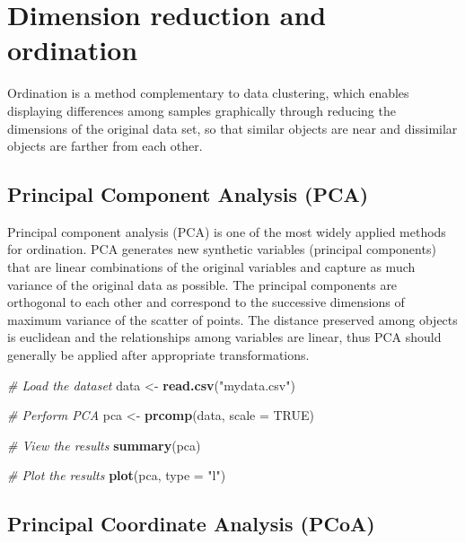 \documentclass[
]{book}
\newenvironment{Shaded}{\begin{snugshade}}{\end{snugshade}}
\newcommand{\AttributeTok}[1]{\textcolor[rgb]{0.13,0.29,0.53}{#1}}
\newcommand{\CommentTok}[1]{\textcolor[rgb]{0.56,0.35,0.01}{\textit{#1}}}
\newcommand{\ConstantTok}[1]{\textcolor[rgb]{0.56,0.35,0.01}{#1}}
\newcommand{\FunctionTok}[1]{\textcolor[rgb]{0.13,0.29,0.53}{\textbf{#1}}}
\newcommand{\NormalTok}[1]{#1}
\newcommand{\OtherTok}[1]{\textcolor[rgb]{0.56,0.35,0.01}{#1}}
\newcommand{\StringTok}[1]{\textcolor[rgb]{0.31,0.60,0.02}{#1}}
\begin{document}
\normalsize

\hypertarget{dimension-reduction-ordination}{%
\section{Dimension reduction and ordination}\label{dimension-reduction-ordination}}

Ordination is a method complementary to data clustering, which enables displaying differences among samples graphically through reducing the dimensions of the original data set, so that similar objects are near and dissimilar objects are farther from each other.

\hypertarget{pca}{%
\subsection{Principal Component Analysis (PCA)}\label{pca}}

Principal component analysis (PCA) is one of the most widely applied methods for ordination. PCA generates new synthetic variables (principal components) that are linear combinations of the original variables and capture as much variance of the original data as possible. The principal components are orthogonal to each other and correspond to the successive dimensions of maximum variance of the scatter of points. The distance preserved among objects is euclidean and the relationships among variables are linear, thus PCA should generally be applied after appropriate transformations.

\small

\begin{Shaded}
\begin{Highlighting}[]
\CommentTok{\# Load the dataset}
\NormalTok{data }\OtherTok{\textless{}{-}} \FunctionTok{read.csv}\NormalTok{(}\StringTok{"mydata.csv"}\NormalTok{)}

\CommentTok{\# Perform PCA}
\NormalTok{pca }\OtherTok{\textless{}{-}} \FunctionTok{prcomp}\NormalTok{(data, }\AttributeTok{scale =} \ConstantTok{TRUE}\NormalTok{)}

\CommentTok{\# View the results}
\FunctionTok{summary}\NormalTok{(pca)}

\CommentTok{\# Plot the results}
\FunctionTok{plot}\NormalTok{(pca, }\AttributeTok{type =} \StringTok{"l"}\NormalTok{)}
\end{Highlighting}
\end{Shaded}

\normalsize

\hypertarget{pcoa}{%
\subsection{Principal Coordinate Analysis (PCoA)}\label{pcoa}}
\end{document}
